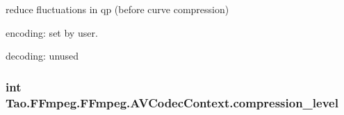 \label{struct_tao_1_1_f_fmpeg_1_1_f_fmpeg_1_1_a_v_codec_context_ab2a993d94bcdd15ca8914651266a7293}
reduce fluctuations in qp (before curve compression)
\begin{DoxyItemize}
\item encoding: set by user.
\item decoding: unused 
\end{DoxyItemize}\hypertarget{struct_tao_1_1_f_fmpeg_1_1_f_fmpeg_1_1_a_v_codec_context_aa679758d208754580810ff13e60052cb}{
\subsubsection[{compression\_\-level}]{\setlength{\rightskip}{0pt plus 5cm}int {\bf Tao.FFmpeg.FFmpeg.AVCodecContext.compression\_\-level}}}
\label{struct_tao_1_1_f_fmpeg_1_1_f_fmpeg_1_1_a_v_codec_context_aa679758d208754580810ff13e60052cb}

